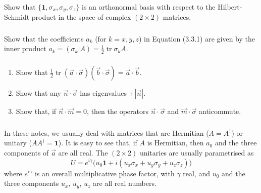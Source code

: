\documentclass[fleqn]{article}
\begin{document}
\hypertarget{section-13}{%
\subsubsection{}\label{section-13}}

Show that \(\{\mathbf{1},\sigma_x,\sigma_y,\sigma_z\}\) is an orthonormal basis with respect to the Hilbert-Schmidt product in the space of complex \((2\times 2)\) matrices.

\hypertarget{section-14}{%
\subsubsection{}\label{section-14}}

Show that the coefficients \(a_k\) (for \(k=x,y,z\)) in Equation (3.3.1) are given by the inner product \(a_k = (\sigma_k|A) = \frac12\operatorname{tr}\sigma_k A\).

\hypertarget{section-15}{%
\subsubsection{}\label{section-15}}

\begin{enumerate}
\def\labelenumi{\arabic{enumi}.}
\item
  Show that \(\frac12\operatorname{tr}(\vec{a}\cdot\vec{\sigma})(\vec{b}\cdot\vec{\sigma}) = \vec{a}\cdot\vec{b}\).
\item
  Show that any \(\vec{n}\cdot\vec{\sigma}\) has eigenvalues \(\pm|\vec{n}|\).
\item
  Show that, if \(\vec{n}\cdot\vec{m}=0\), then the operators \(\vec{n}\cdot\vec{\sigma}\) and \(\vec{m}\cdot\vec{\sigma}\) anticommute.
\end{enumerate}

\hypertarget{section-16}{%
\subsubsection{}\label{section-16}}

In these notes, we usually deal with matrices that are Hermitian (\(A=A^\dagger\)) or unitary (\(AA^\dagger=\mathbf{1}\)).
It is easy to see that, if \(A\) is Hermitian, then \(a_0\) and the three components of \(\vec{a}\) are all real.
The \((2\times 2)\) unitaries are usually parametrised as
\[
  U = e^{i\gamma}\Big(u_0\mathbf{1}+ i(u_x\sigma_x + u_y\sigma_y + u_z\sigma_z)\Big)
\]
where \(e^{i\gamma}\) is an overall multiplicative phase factor, with \(\gamma\) real, and \(u_0\) and the three components \(u_x\), \(u_y\), \(u_z\) are all real numbers.
\end{document}
